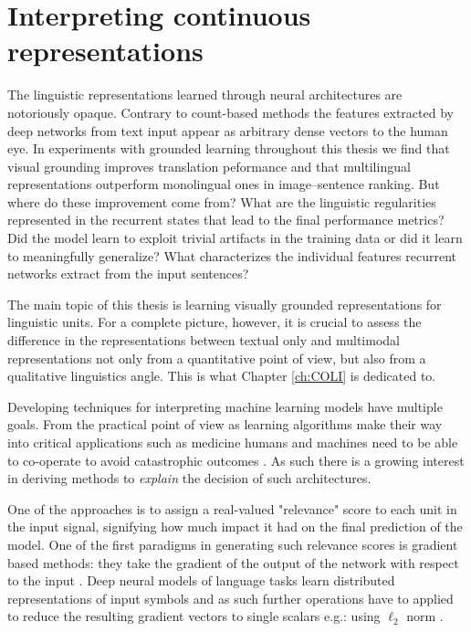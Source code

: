 \section{Interpreting continuous representations}
\label{sec:interpret}
The linguistic representations learned through neural architectures are notoriously opaque.
Contrary to count-based methods the features extracted by deep networks from text input
appear as arbitrary dense vectors to the human eye.
In experiments with grounded learning throughout this thesis we find that visual grounding
improves translation peformance and that multilingual representations outperform monolingual
ones in image--sentence ranking.
But where do these improvement come from? What are the linguistic
regularities represented in the recurrent states that lead to the final performance metrics?
Did the model learn to exploit trivial artifacts in the training data or did it learn to meaningfully generalize?
What characterizes the individual features recurrent networks extract from the input sentences?

The main topic of this thesis is learning visually grounded representations for linguistic units.
For a complete picture, however, it is crucial to assess the difference in the representations
between textual only and multimodal representations not only from a quantitative point of view,
but also from a qualitative linguistics angle.
This is what Chapter \ref{ch:COLI} is dedicated to.

Developing techniques for interpreting machine learning models have multiple goals.
From the practical point of view as learning algorithms make their way into critical applications
such as medicine humans and machines need to be able to co-operate to avoid catastrophic
outcomes \citep{caruana2015intelligible}. As such there is a growing interest in deriving methods
to \emph{explain} the decision of such architectures.

One of the approaches is to assign a real-valued "relevance" score to each unit in the input signal,
signifying how much impact it had on the final prediction of the model.
One of the first paradigms in generating such relevance scores is gradient based methods:
they take the gradient of the output of the network with respect to the input \cite{simonyan2013deep}.
Deep neural models of language tasks learn distributed representations of input symbols
and as such further operations have to applied to reduce the resulting gradient vectors to
single scalars e.g.: using $\ell_2$ norm \citep{bansal2016ask}.

